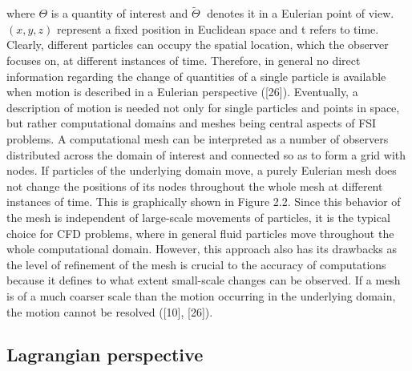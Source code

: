 where $\Theta$ is a quantity of interest and $\tilde{\Theta}$ denotes it in a Eulerian point of view. $(x, y, z)$ represent a fixed position in Euclidean space and t refers to time. Clearly, different particles can occupy the spatial location, which the observer focuses on, at different instances of time. Therefore, in general no direct information regarding the change of quantities of a single particle is available when motion is described
in a Eulerian perspective ([26]).
Eventually, a description of motion is needed not only for single particles and points in space, but rather
computational domains and meshes being central aspects of FSI problems. A computational mesh can be
interpreted as a number of observers distributed across the domain of interest and connected so as to form
a grid with nodes. If particles of the underlying domain move, a purely Eulerian mesh does not change
the positions of its nodes throughout the whole mesh at different instances of time. This is graphically
shown in Figure 2.2. Since this behavior of the mesh is independent of large-scale movements of particles,
it is the typical choice for CFD problems, where in general fluid particles move throughout the whole
computational domain. However, this approach also has its drawbacks as the level of refinement of the
mesh is crucial to the accuracy of computations because it defines to what extent small-scale changes can
be observed. If a mesh is of a much coarser scale than the motion occurring in the underlying domain,
the motion cannot be resolved ([10], [26]).

\subsection{Lagrangian perspective}
\label{subsec:lagrange}

